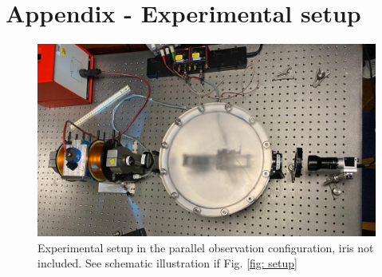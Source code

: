 \documentclass[11pt]{article}
\begin{document}
\section{Appendix - Experimental setup} \label{sec: app setup}
\begin{figure}[h!]
    \centering
    \includegraphics[width=0.65\linewidth]{setup photo.jpeg}
    \captionsetup{justification=centering}
    \caption{Experimental setup in the parallel observation configuration, iris not included. See schematic illustration if Fig. \ref{fig: setup}}
    \label{fig: setup photo}
\end{figure}
\end{document}
